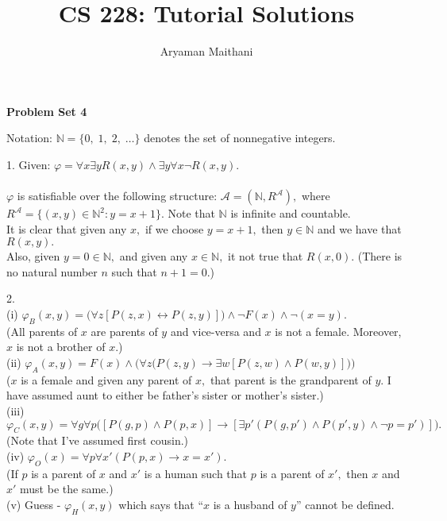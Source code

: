 \documentclass{article}
\title{CS 228: Tutorial Solutions}
\author{Aryaman Maithani}
\date{}
\begin{document}
\maketitle
\begin{center}
\textbf{Problem Set 4}
\end{center}
Notation: $\mathbb{N} = \{0,\;1,\;2,\;\ldots\}$ denotes the set of nonnegative integers.

\hrulefill

1. Given: $\varphi = \forall x \exists y R(x, y) \wedge \exists y \forall x \neg R(x, y).$ \\~\\
$\varphi$ is satisfiable over the following structure: $\mathcal{A} = (\mathbb{N}, R^\mathcal{A}),$ where $R^\mathcal{A} = \{(x, y) \in \mathbb{N}^2 : y = x + 1\}.$ Note that $\mathbb{N}$ is infinite and countable.\\
It is clear that given any $x,$ if we choose $y = x+1,$ then $y \in \mathbb{N}$ and we have that $R(x, y).$\\
Also, given $y = 0 \in \mathbb{N},$ and given any $x \in \mathbb{N},$ it not true that $R(x, 0).$ (There is no natural number $n$ such that $n + 1 = 0.$)

\hrulefill

2.\\
(i) $\varphi_B(x, y) = \big(\forall z[P(z, x) \leftrightarrow P(z, y)]\big) \wedge \neg F(x) \wedge \neg (x = y).$\\
(All parents of $x$ are parents of $y$ and vice-versa and $x$ is not a female. Moreover, $x$ is not a brother of $x.$)\\
(ii) $\varphi_A(x, y) = F(x) \wedge \bigg(\forall z\big(P(z, y) \to \exists w [P(z, w) \wedge P(w, y)]\big)\bigg)$\\
($x$ is a female and given any parent of $x,$ that parent is the grandparent of $y.$ I have assumed aunt to either be father's sister or mother's sister.)\\
(iii) $\varphi_C(x, y) = \forall g \forall p\big([P(g, p) \wedge P(p, x)] \to [\exists p' (P(g, p') \wedge P(p', y) \wedge \neg p = p')]\big).$\\
(Note that I've assumed first cousin.)\\
(iv) $\varphi_O(x) = \forall p \forall x'(P(p, x) \to x = x').$\\
(If $p$ is a parent of $x$ and $x'$ is a human such that $p$ is a parent of $x',$ then $x$ and $x'$ must be the same.)\\
(v) Guess - $\varphi_H(x, y)$ which says that ``$x$ is a husband of $y$'' cannot be defined.
\end{document}
